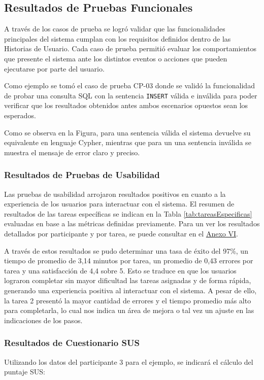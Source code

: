 \subsection{Resultados de Pruebas Funcionales}
A través de los casos de prueba se logró validar que las funcionalidades principales del sistema cumplan con los requisitos definidos dentro de las Historias de Usuario. Cada caso de prueba permitió evaluar los comportamientos que presente el sistema ante los distintos eventos o acciones que pueden ejecutarse por parte del usuario.

Como ejemplo se tomó el caso de prueba CP-03 donde se validó la funcionalidad de probar una consulta SQL con la sentencia \texttt{INSERT} válida e inválida para poder verificar que los resultados obtenidos antes ambos escenarios opuestos sean los esperados.

Como se observa en la Figura, para una sentencia válida el sistema devuelve su equivalente en lenguaje Cypher, mientras que para un una sentencia inválida se muestra el mensaje de error claro y preciso.


\subsubsection{Resultados de Pruebas de Usabilidad}
Las pruebas de usabilidad arrojaron resultados positivos en cuanto a la experiencia de los usuarios para interactuar con el sistema. El resumen de resultados de las tareas específicas se indican en la Tabla \ref{tab:tareasEspecificas} evaluadas en base a las métricas definidas previamente. Para un ver los resultados detallados por participante y por tarea, se puede consultar en el \hyperlink{anexoVI}{Anexo VI}.



A través de estos resultados se pudo determinar una tasa de éxito del 97\%, un tiempo de promedio de 3,14 minutos por tarea, un promedio de 0,43 errores por tarea y una satisfacción de 4,4 sobre 5. Esto se traduce en que los usuarios lograron completar sin mayor dificultad las tareas asignadas y de forma rápida, generando una experiencia positiva al interactuar con el sistema. A pesar de ello, la tarea 2 presentó la mayor cantidad de errores y el tiempo promedio más alto para completarla, lo cual nos indica un área de mejora o tal vez un ajuste en las indicaciones de los pasos.


\subsubsection{Resultados de Cuestionario SUS}
Utilizando los datos del participante 3 para el ejemplo, se indicará el cálculo del puntaje SUS:

